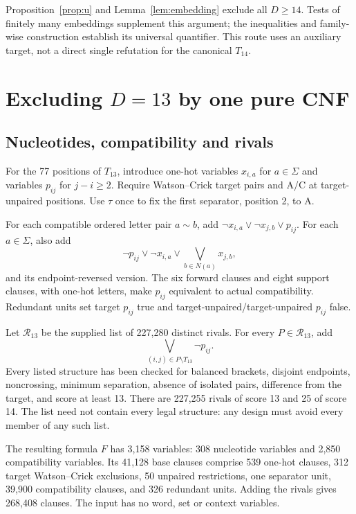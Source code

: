 \documentclass[11pt,a4paper]{article}
\theoremstyle{definition}
\newcommand{\comp}{\mathrel{\sim}}
\begin{document}
Proposition~\ref{prop:u} and Lemma~\ref{lem:embedding} exclude all
$D\geq14$. Tests of finitely many embeddings supplement this argument;
the inequalities and family-wise construction establish its universal
quantifier. This route uses an auxiliary target, not a direct single
refutation for the canonical $T_{14}$.

\section{Excluding \texorpdfstring{$D=13$}{D = 13} by one pure CNF}\label{sec:d13}
\subsection{Nucleotides, compatibility and rivals}\label{sec:cnf}
For the 77 positions of $T_{13}$, introduce one-hot variables
$x_{i,a}$ for $a\in\Sigma$ and variables $p_{ij}$ for $j-i\geq2$.
Require Watson--Crick target pairs and A/C at target-unpaired positions.
Use $\tau$ once to fix the first separator, position 2, to A.

For each compatible ordered letter pair $a\comp b$, add
$\neg x_{i,a}\lor\neg x_{j,b}\lor p_{ij}$. For each $a\in\Sigma$,
also add
\begin{equation}\label{eq:support}
 \neg p_{ij}\lor\neg x_{i,a}\lor\bigvee_{b\in N(a)}x_{j,b},
\end{equation}
and its endpoint-reversed version. The six forward clauses and eight
support clauses, with one-hot letters, make $p_{ij}$ equivalent to
actual compatibility. Redundant units set target $p_{ij}$ true and
target-unpaired/target-unpaired $p_{ij}$ false.

Let $\mathcal R_{13}$ be the supplied list of 227,280 distinct rivals.
For every $P\in\mathcal R_{13}$, add
\begin{equation}\label{eq:rival-clause}
 \bigvee_{(i,j)\in P\setminus T_{13}}\neg p_{ij}.
\end{equation}
Every listed structure has been checked for balanced brackets,
disjoint endpoints, noncrossing, minimum separation, absence of isolated
pairs, difference from the target, and score at least 13.
There are 227,255 rivals of score 13 and 25 of score 14.
The list need not contain every legal structure: any design must avoid
every member of any such list.

The resulting formula $F$ has 3,158 variables: 308 nucleotide variables
and 2,850 compatibility variables. Its 41,128 base clauses comprise
539 one-hot clauses, 312 target Watson--Crick exclusions, 50 unpaired
restrictions, one separator unit, 39,900 compatibility clauses, and
326 redundant units. Adding the rivals gives 268,408 clauses.
The input has no word, set or context variables.
\end{document}
